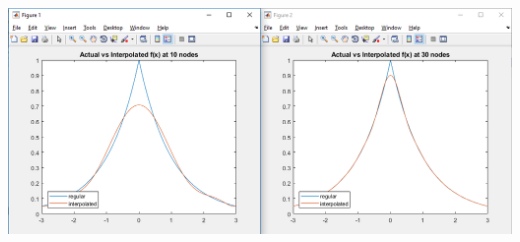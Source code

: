 \documentclass[12pt]{article}
\begin{document}
\begin{enumerate}
			\begin{center}
			\includegraphics[scale=0.55]{hwg2}
		\end{center} 
	
	\end{enumerate}
	
\pagebreak	
	
\end{document}
